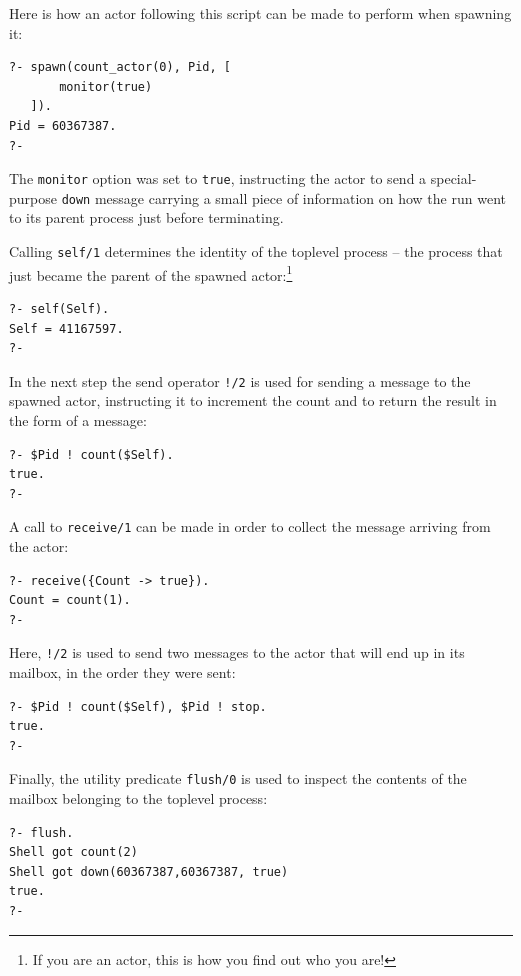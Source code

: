 Here is how an actor following this script can be made to perform when spawning it:

\begin{verbatim}
?- spawn(count_actor(0), Pid, [
       monitor(true)
   ]).
Pid = 60367387.
?-
\end{verbatim}

\noindent The \texttt{monitor} option was set to \texttt{true}, instructing the actor to send a special-purpose \texttt{down} message carrying a small piece of information on how the run went to its parent process just before terminating. %

Calling \texttt{self/1} determines the identity of the toplevel process -- the process that just became the parent of the spawned actor:\footnote{If you are an actor, this is how you find out who you are!}

\begin{verbatim}
?- self(Self).
Self = 41167597.
?-
\end{verbatim}

\noindent In the next step the send operator \texttt{!/2} is used for sending a message to the spawned actor, instructing it to increment the count and to return the result in the form of a message:

\begin{verbatim}
?- $Pid ! count($Self).
true.
?-
\end{verbatim}

\noindent A call to \texttt{receive/1} can be made in order to collect the message arriving from the actor:

\begin{verbatim}
?- receive({Count -> true}).
Count = count(1).
?-
\end{verbatim}

\noindent Here, \texttt{!/2} is used to send two messages to the actor that will end up in its mailbox, in the order they were sent:

\begin{verbatim}
?- $Pid ! count($Self), $Pid ! stop.
true.
?-
\end{verbatim}

\noindent Finally, the utility predicate \texttt{flush/0} is used to inspect the contents of the mailbox belonging to the toplevel process:

\begin{verbatim}
?- flush.
Shell got count(2)
Shell got down(60367387,60367387, true)
true.
?-
\end{verbatim}

